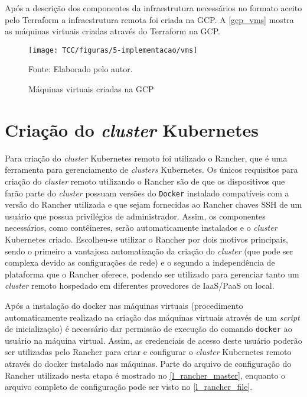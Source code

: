 Após a descrição dos componentes da infraestrutura necessários no formato aceito pelo Terraform a infraestrutura remota foi criada na \ac{GCP}. A \autoref{gcp_vms} mostra as máquinas virtuais criadas através do Terraform na \ac{GCP}.

\begin{figure}[!htpb]
	\centering
	\caption{Máquinas virtuais criadas na \ac{GCP}}
    \texttt{[image: TCC/figuras/5-implementacao/vms]}
    
	Fonte: Elaborado pelo autor.
 	\label{gcp_vms}
\end{figure}

\section{Criação do \textit{cluster} Kubernetes}

Para criação do \textit{cluster} Kubernetes remoto foi utilizado o Rancher, que é uma ferramenta para gerenciamento de \textit{clusters} Kubernetes. Os únicos requisitos para criação do \textit{cluster} remoto utilizando o Rancher são de que os dispositivos que farão parte do \textit{cluster} possuam versões do \texttt{Docker} instalado compatíveis com a versão do Rancher utilizada e que sejam fornecidas ao Rancher chaves \ac{SSH} de um usuário que possua privilégios de administrador. Assim, os componentes necessários, como contêineres, serão automaticamente instalados e o \textit{cluster} Kubernetes criado. Escolheu-se utilizar o Rancher por dois motivos principais, sendo o primeiro a vantajosa automatização da criação do \textit{cluster} (que pode ser complexa devido as configurações de rede) e o segundo a independência de plataforma que o Rancher oferece, podendo ser utilizado para gerenciar tanto um \textit{cluster} remoto hospedado em diferentes provedores de \ac{IaaS}/\ac{PaaS} ou local.

Após a instalação do docker nas máquinas virtuais (procedimento automaticamente realizado na criação das máquinas virtuais através de um \textit{script} de inicialização) é necessário dar permissão de execução do comando \texttt{docker} ao usuário na máquina virtual. Assim, as credenciais de acesso deste usuário poderão ser utilizadas pelo Rancher para criar e configurar o \textit{cluster} Kubernetes remoto através do docker instalado nas máquinas. Parte do arquivo de configuração do Rancher utilizado nesta etapa é mostrado no \autoref{l_rancher_master}, enquanto o arquivo completo de configuração pode ser visto no \autoref{l_rancher_file}.
\newline

